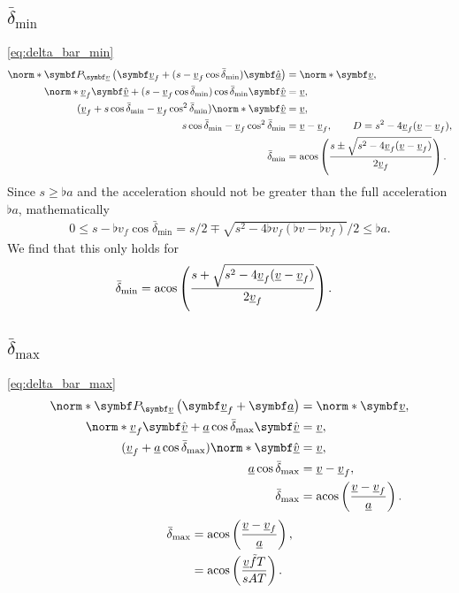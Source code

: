 \subsection{\texorpdfstring{$\bar{\delta}_{\min}$}{bar delta\_min}}
\label{app:derive_delta_bar_min}
\eqref{eq:delta_bar_min}
\begin{align*}
\norm*{\projmat{\flat{v}} \left( \vec{\flat{v}}_f + (s - \flat{v}_f \cos\bar{\delta}_{\min})\uvec{\flat{a}} \right)} &= \norm*{\vec{\flat{v}}},\\
\norm*{\flat{v}_f \uvec{\flat{v}} + (s - \flat{v}_f \cos\bar{\delta}_{\min})\cos\bar{\delta}_{\min}\uvec{\flat{v}}} &= \flat{v},\\
(\flat{v}_f + s\cos\bar{\delta}_{\min} - \flat{v}_f \cos^2\bar{\delta}_{\min}) \norm*{\uvec{\flat{v}}} &= \flat{v},\\
s\cos\bar{\delta}_{\min} - \flat{v}_f \cos^2\bar{\delta}_{\min} &= \flat{v} - \flat{v}_f, \qquad D = s^2 - 4 \flat{v}_f (\flat{v} - \flat{v}_f),\\
\bar{\delta}_{\min} &= \acos\left( \frac{s \pm \sqrt{s^2 - 4 \flat{v}_f (\flat{v} - \flat{v}_f)}}{2 \flat{v}_f} \right).\\
\end{align*}
Since $s \ge \flat{a}$ and the acceleration should not be greater than the full acceleration $\flat{a}$, mathematically
\begin{align*}
0 \le s - \flat{v}_f \cos\bar{\delta}_{\min} = s / 2 \mp \sqrt{s^2 - 4 \flat{v}_f (\flat{v} - \flat{v}_f)} \Big/ 2 \le \flat{a}.
\end{align*}
We find that this only holds for
\begin{align*}
\bar{\delta}_{\min} &= \acos\left( \frac{s + \sqrt{s^2 - 4 \flat{v}_f (\flat{v} - \flat{v}_f)}}{2 \flat{v}_f} \right).
\end{align*}


\subsection{\texorpdfstring{$\bar{\delta}_{\max}$}{bar delta\_max}}
\label{app:derive_delta_bar_max}
\eqref{eq:delta_bar_max}
\begin{align*}
\norm*{\projmat{\flat{v}}\left( \vec{\flat{v}}_f + \vec{\flat{a}} \right)} &= \norm*{\vec{\flat{v}}},\\
\norm*{\flat{v}_f \uvec{\flat{v}} + \flat{a} \cos\bar{\delta}_{\max}\uvec{\flat{v}}} &= \flat{v},\\
(\flat{v}_f + \flat{a} \cos\bar{\delta}_{\max}) \norm*{\uvec{\flat{v}}} &= \flat{v},\\
\flat{a} \cos\bar{\delta}_{\max} &= \flat{v} - \flat{v}_f,\\
\bar{\delta}_{\max} &= \acos\left( \frac{\flat{v} - \flat{v}_f}{\flat{a}} \right).
\end{align*}
\begin{align*}
\bar{\delta}_{\max} &= \acos\left( \frac{\flat{v} - \flat{v}_f}{\flat{a}} \right),\\
&= \acos\left( \frac{\flat{v} \tilde{f}T}{sAT} \right).
\end{align*}

